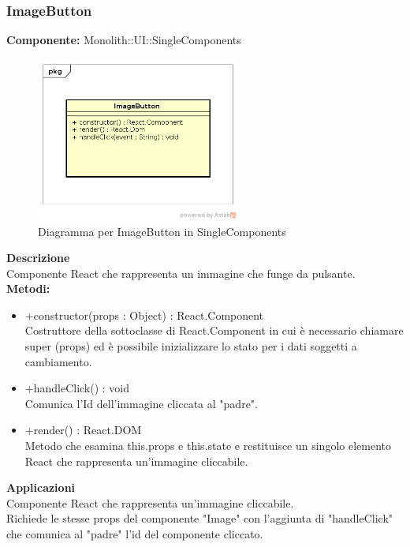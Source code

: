 \clearpage

\subsubsection{ImageButton}
\textbf{Componente:}  Monolith::UI::SingleComponents\\
   \FloatBarrier
   \begin{figure}[ht]
   \centering
   \includegraphics[width=0.6\textwidth]{img/single-ImageButton}
   \caption{{Diagramma per ImageButton in SingleComponents}}
\end{figure}
\FloatBarrier
\textbf{Descrizione}\\
Componente React che rappresenta un immagine che funge da pulsante. \\
\textbf{Metodi:} 
\begin{itemize}
\item +constructor(props : Object) : React.Component 
\\
Costruttore della sottoclasse di React.Component in cui è necessario chiamare super (props) ed è possibile inizializzare lo stato per i dati soggetti a cambiamento.
\item +handleClick() : void 
\\
Comunica l'Id dell'immagine cliccata al "padre". 
\item +render() : React.DOM 
\\
Metodo che esamina this.props e this.state e restituisce un singolo elemento React che rappresenta un'immagine cliccabile.
\end{itemize} 


\textbf{Applicazioni}\\
Componente React che rappresenta un'immagine cliccabile.\\ Richiede le stesse props del componente "Image" con l'aggiunta di "handleClick" che comunica al "padre" l'id del componente cliccato. 


